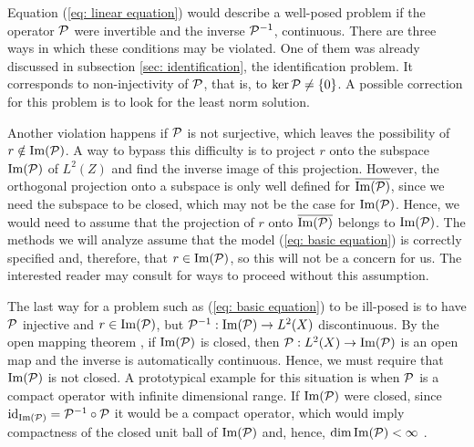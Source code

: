 
Equation (\ref{eq: linear equation}) would describe a well-posed problem if the operator $ \mathcal{P} $ were invertible and the inverse $ \mathcal{P}^{ -1 } $, continuous.
There are three ways in which these conditions may be violated.
One of them was already discussed in subsection \ref{sec: identification}, the identification problem.
It corresponds to non-injectivity of $ \mathcal{P} $, that is, to $ \ker \mathcal{P} \neq \left\{ 0 \right\} $.
A possible correction for this problem is to look for the least norm solution.

Another violation happens if $ \mathcal{P} $ is not surjective, which leaves the possibility of $ r \notin \operatorname{Im} ( \mathcal{P} ) $.
A way to bypass this difficulty is to project $ r $ onto the subspace $ \operatorname{Im} ( \mathcal{P} ) $ of $ L^{ 2 } ( Z ) $ and find the inverse image of this projection.
However, the orthogonal projection onto a subspace is only well defined for $ \overline{\operatorname{Im} ( \mathcal{P} )} $, since we need the subspace to be closed, which may not be the case for $ \operatorname{Im} ( \mathcal{P} ) $.
Hence, we would need to assume that the projection of $ r $ onto $ \overline{\operatorname{Im} ( \mathcal{P} )} $ belongs to $ \operatorname{Im} ( \mathcal{P} ) $.
The methods we will analyze assume that the model (\ref{eq: basic equation}) is correctly specified and, therefore, that $ r \in \operatorname{Im} ( \mathcal{P} ) $, so this will not be a concern for us.
The interested reader may consult \cite{florens2007} for ways to proceed without this assumption.

The last way for a problem such as (\ref{eq: basic equation}) to be ill-posed is to have $ \mathcal{P} $ injective and $ r \in \operatorname{Im} ( \mathcal{P} ) $, but $ \mathcal{P}^{ -1 } : \operatorname{Im} ( \mathcal{P} ) \to L^{ 2 } ( X ) $ discontinuous.
By the open mapping theorem \cite{rudin1991}, if $ \operatorname{Im} ( \mathcal{P} ) $ is closed, then $ \mathcal{P} : L^{ 2 } ( X ) \to \operatorname{Im} ( \mathcal{P} ) $ is an open map and the inverse is automatically continuous.
Hence, we must require that $ \operatorname{Im} ( \mathcal{P} ) $ is not closed.
A prototypical example for this situation is when $ \mathcal{P} $ is a compact operator with infinite dimensional range.
If $ \operatorname{Im} ( \mathcal{P} ) $ were closed, since $ \operatorname{id}_{ \operatorname{Im} ( \mathcal{P} ) } = \mathcal{P}^{ -1 } \circ \mathcal{P} $ it would be a compact operator, which would imply compactness of the closed unit ball of $ \operatorname{Im} ( \mathcal{P} ) $ and, hence, $ \dim \operatorname{Im} ( \mathcal{P} ) < \infty $ \cite{florens2007}.

